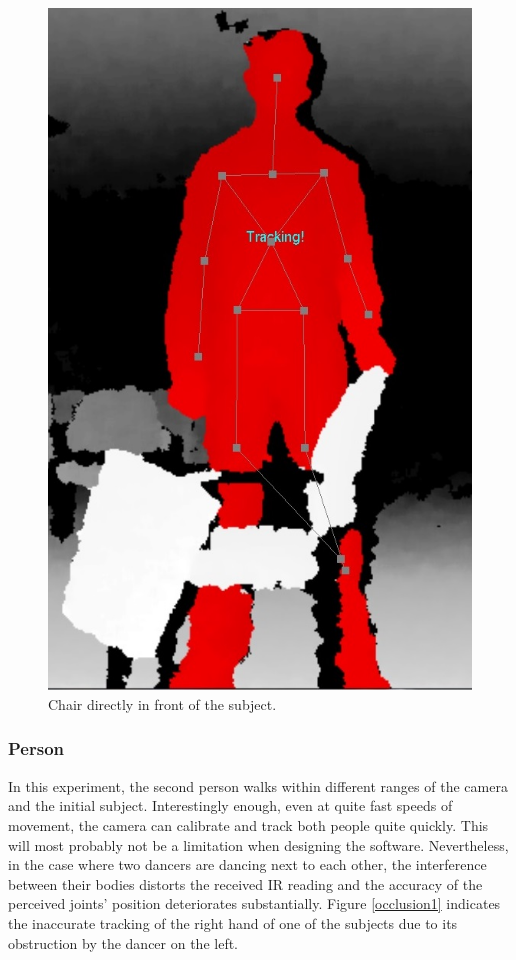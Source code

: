 \documentclass[10pt,a4paper]{article}
\begin{document}
\begin{figure}[H]
\center
\includegraphics[scale=0.2]{Chair.jpg} 
\caption{Chair directly in front of the subject.}
\label{chair}
\end{figure} 
\subsubsection{Person}
\noindent
In this experiment, the second person walks within different ranges of the camera and the initial subject. Interestingly enough, even at quite fast speeds of movement, the camera can calibrate and track both people quite quickly. This will most probably not be a limitation when designing the software. Nevertheless, in the case where two dancers are dancing next to each other, the interference between their bodies distorts the received IR reading and the accuracy of the perceived joints' position deteriorates substantially. Figure \ref{occlusion1} indicates the inaccurate tracking of the right hand of one of the subjects due to its obstruction by the dancer on the left.
\end{document}
